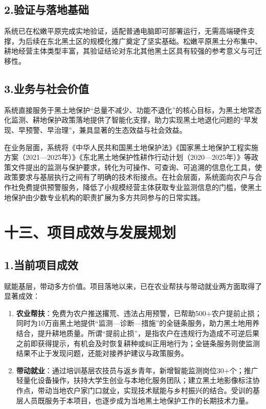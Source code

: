 \documentclass[12pt, a4paper]{ctexart}
\begin{document}
\subsection{2.验证与落地基础}

系统已在松嫩平原完成实地验证，适配普通电脑即可部署运行，无需高端硬件支撑，为后续在东北黑土区的规模化推广奠定了坚实基础。松嫩平原黑土分布集中、耕地经营主体类型丰富，其验证结论对东北其他黑土区具有较强的参考意义与可迁移性。

\subsection{3.业务与社会价值}

系统直接服务于黑土地保护“总量不减少、功能不退化”的核心目标，为黑土地常态化监测、耕地保护政策落地提供了智能化支撑，助力实现黑土地退化问题的“早发现、早预警、早治理”，兼具显著的生态效益与社会效益。

在业务层面，系统将《中华人民共和国黑土地保护法》《国家黑土地保护工程实施方案（2021—2025年）》《东北黑土地保护性耕作行动计划（2020—2025年）》等政策文件提出的监测与保护要求，转化为可操作、可查询、可追溯的信息化工具，使政策要求与基层执行之间有了明确的技术衔接点。在社会层面，系统面向农户与合作社免费提供预警服务，降低了小规模经营主体获取专业监测信息的门槛，使黑土地保护由少数专业机构的职责扩展为多方共同参与的日常实践。

\section{十三、项目成效与发展规划}

\subsection{1.当前项目成效}

赋能基层，带动多方价值。项目落地以来，已在农业帮扶与带动就业两方面取得了显著成效：

\begin{enumerate}
  \item \textbf{农业帮扶}：免费为农户推送撂荒、违法占用预警，已帮助500+农户提前止损；同时为10万亩黑土地提供“监测—诊断—措施”的全链条服务，助力黑土地用养结合，提升耕地质量。所谓“提前止损”，是指农户在违规行为造成不可逆后果之前即获得提示，有机会及时恢复耕种或纠正用地行为；全链条服务则使监测结果不止于发现问题，还能对接养护建议与政策服务。
  \item \textbf{带动就业}：通过培训基层农技员与返乡青年，新增智能监测岗位30+个；推广轻量化设备操作，扶持大学生创业与本地化服务团队；建立黑土地影像标注协作点，带动当地农户家门口就业，实现技术赋能与乡村振兴的结合。受训的基层人员既服务于本项目，也逐步成为当地黑土地保护工作的长期技术力量。
\end{enumerate}
\end{document}
